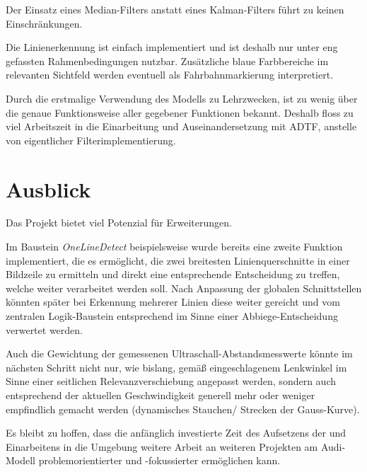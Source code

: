 \documentclass[12pt, a4paper]{scrartcl}
\begin{document}
Der Einsatz eines Median-Filters anstatt eines Kalman-Filters führt zu keinen Einschränkungen.

Die Linienerkennung ist einfach implementiert und ist deshalb nur unter eng gefassten Rahmenbedingungen nutzbar. Zusätzliche blaue Farbbereiche im relevanten Sichtfeld werden eventuell als Fahrbahnmarkierung interpretiert.

Durch die erstmalige Verwendung des Modells zu Lehrzwecken, ist zu wenig über die genaue Funktionsweise aller gegebener Funktionen bekannt. Deshalb floss zu viel Arbeitszeit in die Einarbeitung und Auseinandersetzung mit ADTF, anstelle von eigentlicher Filterimplementierung.

\section{Ausblick}
Das Projekt bietet viel Potenzial für Erweiterungen.

Im Baustein \emph{OneLineDetect} beispielsweise wurde bereits eine zweite Funktion implementiert, die es ermöglicht, die zwei breitesten Linienquerschnitte in einer Bildzeile zu ermitteln und direkt eine entsprechende Entscheidung zu treffen, welche weiter verarbeitet werden soll. Nach Anpassung der globalen Schnittstellen könnten später bei Erkennung mehrerer Linien diese weiter gereicht und vom zentralen Logik-Baustein entsprechend im Sinne einer Abbiege-Entscheidung verwertet werden.

Auch die Gewichtung der gemessenen Ultraschall-Abstandsmesswerte könnte im nächsten Schritt nicht nur, wie bislang, gemäß eingeschlagenem Lenkwinkel im Sinne einer seitlichen Relevanzverschiebung angepasst werden, sondern auch entsprechend der aktuellen Geschwindigkeit generell mehr oder weniger empfindlich gemacht werden (dynamisches Stauchen/ Strecken der Gauss-Kurve).

Es bleibt zu hoffen, dass die anfänglich investierte Zeit des Aufsetzens der und Einarbeitens in die Umgebung weitere Arbeit an weiteren Projekten am Audi-Modell problemorientierter und -fokussierter ermöglichen kann.


\newpage
{}
\listoffigures
\end{document}
